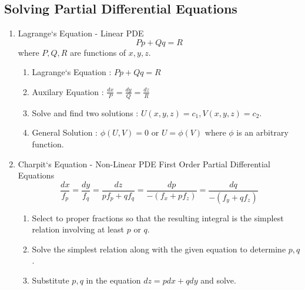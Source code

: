 \subsection{Solving Partial Differential Equations}
\begin{enumerate}
	\item Lagrange`s Equation - Linear PDE
	\begin{equation}
		Pp + Qq = R
	\end{equation}
		where $P,Q,R$ are functions of $x,y,z$.
	\begin{enumerate}
		\item Lagrange`s Equation : $Pp + Qq = R$
		\item Auxilary Equation : $\frac{dx}{P} = \frac{dy}{Q} = \frac{dz}{R}$
		\item Solve and find two solutions : $U(x,y,z) = c_1, V(x,y,z) = c_2$.
		\item General Solution : $\phi(U,V) = 0$ or $U = \phi(V)$ where $\phi$ is an arbitrary function.
	\end{enumerate}

	\item Charpit`s Equation - Non-Linear PDE First Order Partial Differential Equations\\
	\begin{equation}\frac{dx}{f_p} = \frac{dy}{f_q} = \frac{dz}{pf_p + qf_q} = \frac{dp}{-(f_x + pf_z)} = \frac{dq}{-(f_y+qf_z)}\end{equation}
	\begin{enumerate}
		\item Select to proper fractions so that the resulting integral is the simplest relation involving at least $p$ or $q$.
		\item Solve the simplest relation along with the given equation to determine $p,q$.
		\item Substitute $p,q$ in the equation $dz = pdx + qdy$ and solve.
\end{enumerate}
\end{enumerate}

